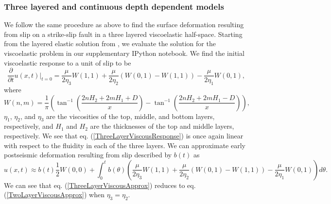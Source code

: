 \documentclass[extra,mreferee]{gji}
\begin{document}
\subsubsection{Three layered and continuous depth dependent models}\label{2d3LModel}
We follow the same procedure as above to find the surface
deformation resulting from slip on a strike-slip fault in a three
layered viscoelastic half-space.  Starting from the layered elastic
solution from \citet{CJ1972}, we evaluate the solution for the
viscoelastic problem in our supplementary IPython notebook.  We find
the initial viscoelastic response to a unit of slip to be
\begin{equation}\label{ThreeLayerViscousResponse}
\frac{\partial}{\partial t}u(x,t)\big|_{t=0} = \frac{\mu}{2\eta_3}W(1,1)
                                      +\frac{\mu}{2\eta_2}(W(0,1) - W(1,1))
                                      -\frac{\mu}{2\eta_1}W(0,1),
\end{equation}
where
\begin{equation}
  W(n,m) = \frac{1}{\pi}\left(\tan^{-1}\left(\frac{2nH_2 + 2mH_1 + D}{x}\right) - 
                              \tan^{-1}\left(\frac{2nH_2 + 2mH_1 - D}{x}\right)\right),
\end{equation}
$\eta_1$, $\eta_2$, and $\eta_3$ are the viscosities of the top,
middle, and bottom layers, respectively, and $H_1$ and $H_2$ are the
thicknesses of the top and middle layers, respectively.  We see that
eq. (\ref{ThreeLayerViscousResponse}) is once again linear with
respect to the fluidity in each of the three layers.  We can
approximate early postseismic deformation resulting from slip
described by $b(t)$ as
\begin{equation}\label{ThreeLayerViscousApprox}
u(x,t) \approx b(t)\frac{1}{2} W(0,0) + 
         \int_0^tb(\theta)\left(\frac{\mu}{2\eta_3}W(1,1)
                               +\frac{\mu}{2\eta_2}(W(0,1) - W(1,1))
                               -\frac{\mu}{2\eta_1}W(0,1)\right)d\theta.
\end{equation}
We can see that eq. (\ref{ThreeLayerViscousApprox}) reduces to eq.
(\ref{TwoLayerViscousApprox}) when $\eta_3 = \eta_2$.
\end{document}
